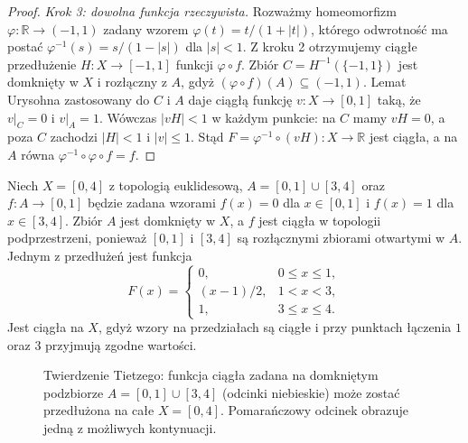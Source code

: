 \begin{proof}
\emph{Krok 3: dowolna funkcja rzeczywista.}
Rozważmy homeomorfizm
$\varphi\colon\mathbb R\to(-1,1)$ zadany wzorem
$\varphi(t)=t/(1+|t|)$, którego odwrotność ma postać
$\varphi^{-1}(s)=s/(1-|s|)$ dla $|s|<1$.
Z kroku 2 otrzymujemy ciągłe przedłużenie
$H\colon X\to[-1,1]$ funkcji $\varphi\circ f$.
Zbiór $C=H^{-1}(\{-1,1\})$ jest domknięty w $X$
i rozłączny z $A$, gdyż
$(\varphi\circ f)(A)\subseteq(-1,1)$.
Lemat Urysohna zastosowany do $C$ i $A$
daje ciągłą funkcję $v\colon X\to[0,1]$ taką,
że $v|_C=0$ i $v|_A=1$.
Wówczas $|vH|<1$ w każdym punkcie: na $C$ mamy
$vH=0$, a poza $C$ zachodzi $|H|<1$ i $|v|\le1$.
Stąd $F=\varphi^{-1}\circ(vH)\colon X\to\mathbb R$
jest ciągła, a na $A$ równa
$\varphi^{-1}\circ\varphi\circ f=f$.
\end{proof}

\begin{przyklad}
\label{ex:topog-tietze-odcinki}
Niech $X=[0,4]$ z topologią euklidesową,
$A=[0,1]\cup[3,4]$ oraz
$f\colon A\to[0,1]$ będzie zadana wzorami
$f(x)=0$ dla $x\in[0,1]$ i $f(x)=1$ dla $x\in[3,4]$.
Zbiór $A$ jest domknięty w $X$, a $f$ jest ciągła
w topologii podprzestrzeni, ponieważ $[0,1]$
i $[3,4]$ są rozłącznymi zbiorami otwartymi w $A$.
Jednym z przedłużeń jest funkcja
\[
F(x)=\begin{cases}
0,&0\le x\le1,\\
(x-1)/2,&1<x<3,\\
1,&3\le x\le4.
\end{cases}
\]
Jest ciągła na $X$, gdyż wzory na przedziałach
są ciągłe i przy punktach łączenia $1$ oraz $3$
przyjmują zgodne wartości.
\end{przyklad}

\begin{figure}[htbp]
\centering
{}
\caption{Twierdzenie Tietzego: funkcja ciągła zadana na
domkniętym podzbiorze $A=[0,1]\cup[3,4]$ (odcinki niebieskie)
może zostać przedłużona na całe $X=[0,4]$.
Pomarańczowy odcinek obrazuje jedną z możliwych kontynuacji.}
\label{fig:topog-tietze-odcinki}
\end{figure}



